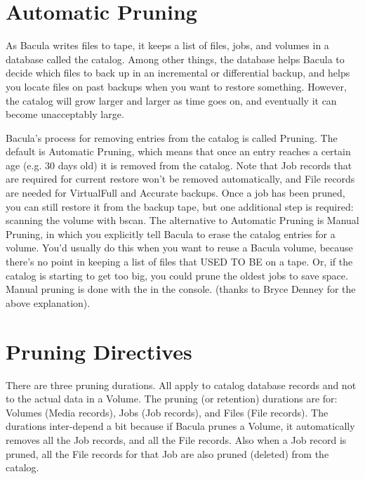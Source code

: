 \label{AutoPruning}
\section{Automatic Pruning}

As Bacula writes files to tape, it keeps a list of files, jobs, and volumes
in a database called the catalog.  Among other things, the database helps
Bacula to decide which files to back up in an incremental or differential
backup, and helps you locate files on past backups when you want to restore
something.  However, the catalog will grow larger and larger as time goes
on, and eventually it can become unacceptably large.

Bacula's process for removing entries from the catalog is called Pruning.  The
default is Automatic Pruning, which means that once an entry reaches a certain
age (e.g.  30 days old) it is removed from the catalog. Note that Job records
that are required for current restore won't be removed automatically, and File
records are needed for VirtualFull and Accurate backups. Once a job has been
pruned, you can still restore it from the backup tape, but one additional step
is required: scanning the volume with bscan.  The alternative to Automatic
Pruning is Manual Pruning, in which you explicitly tell Bacula to erase the
catalog entries for a volume.  You'd usually do this when you want to reuse a
Bacula volume, because there's no point in keeping a list of files that USED TO
BE on a tape.  Or, if the catalog is starting to get too big, you could prune
the oldest jobs to save space.  Manual pruning is done with the  in the console.  (thanks to Bryce Denney for the
above explanation).

\section{Pruning Directives}

There are three pruning durations. All apply to catalog database records and
not to the actual data in a Volume. The pruning (or retention) durations are
for: Volumes (Media records), Jobs (Job records), and Files (File records).
The durations inter-depend a bit because if Bacula prunes a Volume, it
automatically removes all the Job records, and all the File records. Also when
a Job record is pruned, all the File records for that Job are also pruned
(deleted) from the catalog. 

